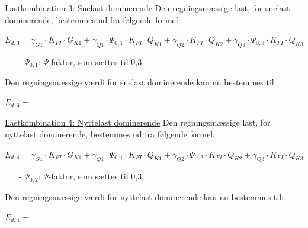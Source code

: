 \underline{Lastkombination 3: Snelast dominerende}
\newline
Den regningsmæssige last, for snelast dominerende, bestemmes ud fra følgende formel:
\begin{center}
 	$E_{d,3}=\gamma_{G1}\cdot K_{FI}\cdot G_{K1}+\gamma_{Q1}\cdot \Psi_{0,1}\cdot K_{FI}\cdot Q_{K1}+\gamma_{Q2}\cdot K_{FI}\cdot Q_{K2}+\gamma_{Q3}\cdot \Psi_{0,3}\cdot K_{FI}\cdot Q_{K3}$
\end{center}
\begin{itemize}
	\item[-] $\Psi_{0,1}$: $\Psi$-faktor, som sættes til 0,3 \citep[ tabel A 1.1 anneks A.1.2.2]{EU90}
\end{itemize}
Den regningsmæssige værdi for snelast dominerende kan nu bestemmes til:
\begin{center}
	$E_{d,3}=$
\end{center}

\underline{Lastkombination 4: Nyttelast dominerende}
\newline
Den regningsmæssige last, for nyttelast dominerende, bestemmes ud fra følgende formel:
\begin{center}
	$E_{d,4}=\gamma_{G1}\cdot K_{FI}\cdot G_{K1}+\gamma_{Q1}\cdot \Psi_{0,1}\cdot K_{FI}\cdot Q_{K1}+\gamma_{Q2}\cdot \Psi_{0,2}\cdot K_{FI}\cdot Q_{K2}+\gamma_{Q3}\cdot K_{FI}\cdot Q_{K3}$
\end{center}
\begin{itemize}
	\item[-] $\Psi_{0,2}$: $\Psi$-faktor, som sættes til 0,3 \citep[ tabel A 1.1 anneks A.1.2.2]{EU90}
\end{itemize}
Den regningsmæssige værdi for nyttelast dominerende kan nu bestemmes til:
\begin{center}
	$E_{d,4}=$
\end{center}